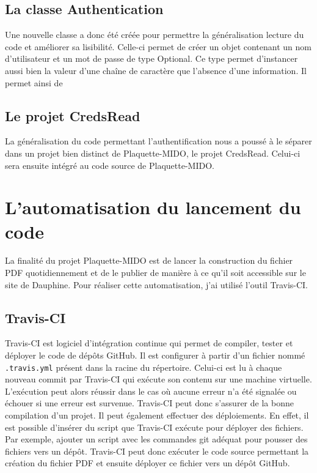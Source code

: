 \subsection{La classe Authentication}

Une nouvelle classe a donc été créée pour permettre la généralisation lecture du code et améliorer sa lisibilité. Celle-ci permet de créer un objet contenant un nom d'utilisateur et un mot de passe de type Optional. Ce type permet d'instancer aussi bien la valeur d'une chaîne de caractère que l'absence d'une information. Il permet ainsi de 

\subsection{Le projet CredsRead}
La généralisation du code permettant l'authentification nous a poussé à le séparer dans un projet bien distinct de Plaquette-MIDO, le projet CredsRead. Celui-ci sera ensuite intégré au code source de Plaquette-MIDO.

\section{L'automatisation du lancement du code}

La finalité du projet Plaquette-MIDO est de lancer la construction du fichier PDF quotidiennement et de le publier de manière à ce qu'il soit accessible sur le site de Dauphine. Pour réaliser cette automatisation, j'ai utilisé l'outil Travis-CI.

\subsection{Travis-CI}
    Travis-CI est logiciel d'intégration continue qui permet de compiler,
    tester et déployer le code de dépôts GitHub. Il est configurer à partir
    d'un fichier nommé \texttt{.travis.yml} présent dans la racine du
    répertoire. Celui-ci est lu à chaque nouveau commit par Travis-CI qui
    exécute son contenu sur une machine virtuelle. L'exécution peut alors
    réussir dans le cas où aucune erreur n'a été signalée ou échouer si une
    erreur est survenue. Travis-CI peut donc s'assurer de la bonne
    compilation d'un projet. Il peut également effectuer des déploiements.
    En effet, il est possible d'insérer du script que Travis-CI exécute pour
    déployer des fichiers. Par exemple, ajouter un script avec les commandes
    git adéquat pour pousser des fichiers vers un dépôt. Travis-CI peut donc
    exécuter le code source permettant la création du fichier PDF et ensuite
    déployer ce fichier vers un dépôt GitHub.

